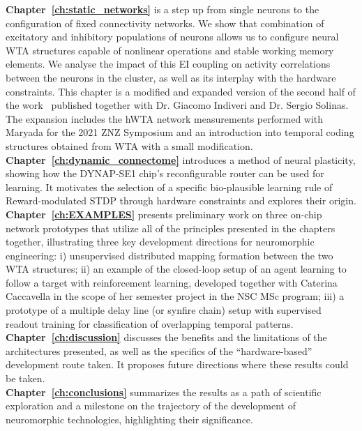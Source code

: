 \textbf{Chapter~\ref{ch:static_networks}} is a step up from single neurons to the configuration of fixed connectivity networks. We show that combination of excitatory and inhibitory populations of neurons allows us to configure neural \ac{WTA} structures capable of nonlinear operations and stable working memory elements. We analyse the impact of this EI coupling on activity correlations between the neurons in the cluster, as well as its interplay with the hardware constraints. This chapter is a modified and expanded version of the second half of the work~\cite{Zendrikov_etal23} published together with Dr. Giacomo Indiveri and Dr. Sergio Solinas. The expansion includes the \ac{hWTA} network measurements performed with Maryada for the 2021 ZNZ Symposium and an introduction into temporal coding structures obtained from \ac{WTA} with a small modification.\\

\textbf{Chapter~\ref{ch:dynamic_connectome}} introduces a method of neural plasticity, showing how the DYNAP-SE1 chip's reconfigurable router can be used for learning. It motivates the selection of a specific bio-plausible learning rule of Reward-modulated STDP through hardware constraints and explores their origin.\\

\textbf{Chapter~\ref{ch:EXAMPLES}} presents preliminary work on three on-chip network prototypes that utilize all of the principles presented in the chapters together, illustrating three key development directions for neuromorphic engineering: i) unsupervised distributed mapping formation between the two \ac{WTA} structures; ii) an example of the closed-loop setup of an agent learning to follow a target with reinforcement learning, developed together with Caterina Caccavella in the scope of her semester project in the NSC MSc program; iii) a prototype of a multiple delay line (or synfire chain) setup with supervised readout training for classification of overlapping temporal patterns.\\

\textbf{Chapter~\ref{ch:discussion}} discusses the benefits and the limitations of the architectures presented, as well as the specifics of the ``hardware-based'' development route taken. It proposes future directions where these results could be taken.\\

\textbf{Chapter~\ref{ch:conclusions}} summarizes the results as a path of scientific exploration and a milestone on the trajectory of the development of neuromorphic technologies, highlighting their significance.\\

